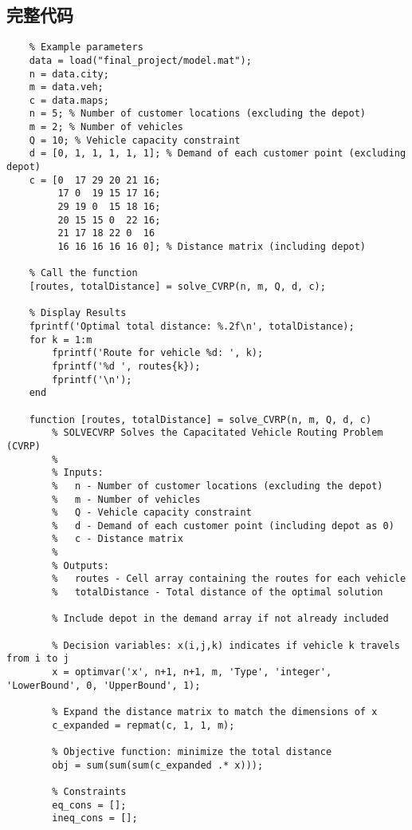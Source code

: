 \subsection{完整代码}
    \begin{lstlisting}
    % Example parameters
    data = load("final_project/model.mat");
    n = data.city;
    m = data.veh;
    c = data.maps;
    n = 5; % Number of customer locations (excluding the depot)
    m = 2; % Number of vehicles
    Q = 10; % Vehicle capacity constraint
    d = [0, 1, 1, 1, 1, 1]; % Demand of each customer point (excluding depot)
    c = [0  17 29 20 21 16;
         17 0  19 15 17 16;
         29 19 0  15 18 16;
         20 15 15 0  22 16;
         21 17 18 22 0  16
         16 16 16 16 16 0]; % Distance matrix (including depot)
        
    % Call the function
    [routes, totalDistance] = solve_CVRP(n, m, Q, d, c);
        
    % Display Results
    fprintf('Optimal total distance: %.2f\n', totalDistance);
    for k = 1:m
        fprintf('Route for vehicle %d: ', k);
        fprintf('%d ', routes{k});
        fprintf('\n');
    end
        
    function [routes, totalDistance] = solve_CVRP(n, m, Q, d, c)
        % SOLVECVRP Solves the Capacitated Vehicle Routing Problem (CVRP)
        %
        % Inputs:
        %   n - Number of customer locations (excluding the depot)
        %   m - Number of vehicles
        %   Q - Vehicle capacity constraint
        %   d - Demand of each customer point (including depot as 0)
        %   c - Distance matrix
        %
        % Outputs:
        %   routes - Cell array containing the routes for each vehicle
        %   totalDistance - Total distance of the optimal solution
            
        % Include depot in the demand array if not already included
        
        % Decision variables: x(i,j,k) indicates if vehicle k travels from i to j
        x = optimvar('x', n+1, n+1, m, 'Type', 'integer', 'LowerBound', 0, 'UpperBound', 1);
        
        % Expand the distance matrix to match the dimensions of x
        c_expanded = repmat(c, 1, 1, m);
            
        % Objective function: minimize the total distance
        obj = sum(sum(sum(c_expanded .* x)));
            
        % Constraints
        eq_cons = [];
        ineq_cons = [];
            

\end{lstlisting}
